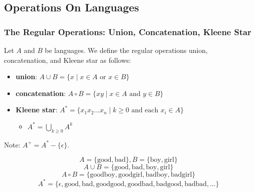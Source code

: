 \documentclass[11pt,a4paper]{article}
\begin{document}
\subsection{Operations On Languages}
\subsubsection{The Regular Operations: Union, Concatenation, Kleene Star}
\begin{definition}
    Let $A$ and $B$ be languages. We define the regular operations union, concatenation, and Kleene star as follows:

    \begin{itemize}
        \item \textbf{union}: $A\cup B = \{x \mid x\in A\text{ or }x\in B\}$
        \item \textbf{concatenation}: $A\circ B = \{xy\mid x\in A\text{ and }y\in B\}$
        \item \textbf{Kleene star}: $A^* = \{x_1x_2 ... x_n\mid k\geq 0 \text{ and each } x_i\in A\}$
        \begin{itemize}
            \item $A^* = \bigcup\limits_{k\geq 0}A^k$
        \end{itemize}
    \end{itemize}

    Note: $A^+=A^*-\{\epsilon\}$.
\end{definition}

\begin{example}
    $$A=\{\text{good},\text{bad}\},B=\{\text{boy},\text{girl}\}$$
    $$A\cup B=\{\text{good},\text{bad},\text{boy},\text{girl}\}$$
    $$A\circ B=\{\text{goodboy},\text{goodgirl},\text{badboy},\text{badgirl}\}$$
    $$A^*=\{\epsilon,\text{good},\text{bad},\text{goodgood},\text{goodbad},\text{badgood},\text{badbad},...\}$$
\end{example}
\end{document}
